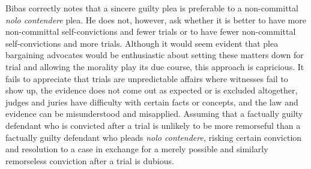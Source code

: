Bibas correctly notes that a sincere guilty plea is preferable to a non-committal \textit{nolo contendere} plea. He does not, however, ask whether it is better to have more non-committal self-convictions and fewer trials or to have fewer non-committal self-convictions and more trials. Although it would seem evident that plea bargaining advocates would be enthusiastic about setting these matters down for trial and allowing the morality play its due course, this approach is capricious. It fails to appreciate that trials are unpredictable affairs where witnesses fail to show up, the evidence does not come out as expected or is excluded altogether, judges and juries have difficulty with certain facts or concepts, and the law and evidence can be misunderstood and misapplied. Assuming that a factually guilty defendant who is convicted after a trial is unlikely to be more remorseful than a factually guilty defendant who pleads \textit{nolo contendere}, risking certain conviction and resolution to a case in exchange for a merely possible and similarly remorseless conviction after a trial is dubious. 

